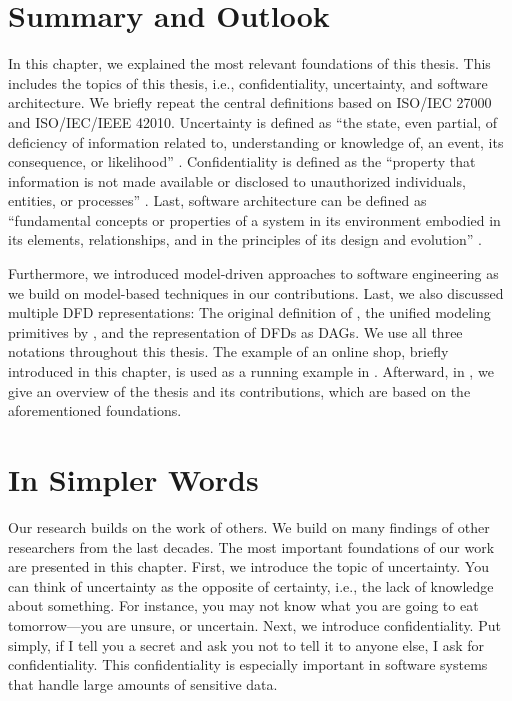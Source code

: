 \section{Summary and Outlook}%
\label{sec:foundations:summary}

In this chapter, we explained the most relevant foundations of this thesis.
This includes the topics of this thesis, i.e., confidentiality, uncertainty, and software architecture.
We briefly repeat the central definitions based on ISO/IEC 27000 and ISO/IEC/IEEE 42010.
Uncertainty is defined as \enquote{the state, even partial, of deficiency of information related to, understanding or knowledge of, an event, its consequence, or likelihood} \cite{international_organization_for_standardization_isoiec_2018}.
Confidentiality is defined as the \enquote{property that information is not made available or disclosed to unauthorized individuals, entities, or processes} \cite{international_organization_for_standardization_isoiec_2018}.
Last, software architecture can be defined as \enquote{fundamental concepts or properties of a system in its environment embodied in its elements, relationships, and in the principles of its design and evolution} \cite{international_organization_for_standardization_isoiecieee_2022}.

Furthermore, we introduced model-driven approaches to software engineering as we build on model-based techniques in our contributions.
Last, we also discussed multiple \ac{DFD} representations: The original definition of \textcite{demarco_structure_1979}, the unified modeling primitives by \textcite{seifermann_unified_2021}, and the representation of \acp{DFD} as \acp{DAG}.
We use all three notations throughout this thesis.
The example of an online shop, briefly introduced in this chapter, is used as a running example in .
Afterward, in , we give an overview of the thesis and its contributions, which are based on the aforementioned foundations.





\section{In Simpler Words}%
\label{sec:foundations:simple}

Our research builds on the work of others.
We build on many findings of other researchers from the last decades.
The most important foundations of our work are presented in this chapter.
First, we introduce the topic of uncertainty.
You can think of uncertainty as the opposite of certainty, i.e., the lack of knowledge about something.
For instance, you may not know what you are going to eat tomorrow---you are unsure, or uncertain.
Next, we introduce confidentiality.
Put simply, if I tell you a secret and ask you not to tell it to anyone else, I ask for confidentiality.
This confidentiality is especially important in software systems that handle large amounts of sensitive data.

